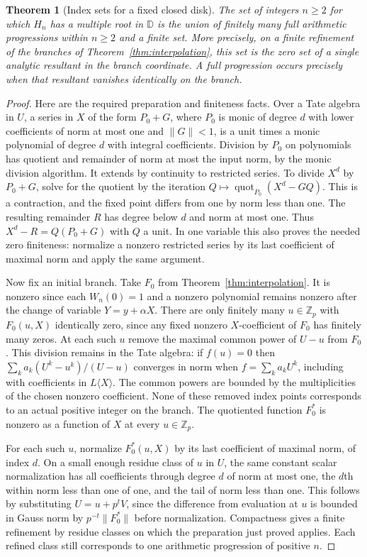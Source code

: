\documentclass[11pt]{article}
\newtheorem{theorem}{Theorem}\newtheorem{lemma}[theorem]{Lemma}
\begin{document}
\begin{theorem}[Index sets for a fixed closed disk]\label{thm:local-set}
The set of integers $n\ge2$ for which $H_n$ has a multiple root
in $\mathbb D$ is the union of finitely many full arithmetic
progressions within $n\ge2$ and a finite set.
More precisely, on a finite refinement of the branches of
Theorem~\ref{thm:interpolation}, this set is the zero set of
a single analytic resultant in the branch coordinate. A full
progression occurs precisely when that resultant vanishes
identically on the branch.
\end{theorem}
\begin{proof}
Here are the required preparation and finiteness facts.
Over a Tate algebra in $U$, a series in $X$ of the form
$P_0+G$, where $P_0$ is monic of degree $d$ with lower coefficients
of norm at most one and $\|G\|<1$, is a unit times a monic
polynomial of degree $d$ with integral coefficients.
Division by $P_0$ on polynomials has quotient and remainder
of norm at most the input norm, by the monic division algorithm.
It extends by continuity to restricted series. To divide
$X^d$ by $P_0+G$, solve for the quotient by the iteration
$Q\mapsto\operatorname{quot}_{P_0}(X^d-GQ)$.
This is a contraction, and the fixed point differs from one
by norm less than one. The resulting remainder $R$ has
degree below $d$ and norm at most one. Thus $X^d-R=Q(P_0+G)$
with $Q$ a unit. In one variable this also proves the needed
zero finiteness: normalize a nonzero restricted series by its
last coefficient of maximal norm and apply the same argument.

Now fix an initial branch. Take $F_0$ from
Theorem~\ref{thm:interpolation}. It is nonzero since each
$W_n(0)=1$ and a nonzero polynomial remains nonzero after
the change of variable $Y=y+\alpha X$.
There are only finitely many $u\in\mathbb Z_p$ with
$F_0(u,X)$ identically zero, since any fixed nonzero
$X$-coefficient of $F_0$ has finitely many zeros.
At each such $u$ remove the maximal common power of $U-u$
from $F_0$. This division remains in the Tate algebra:
if $f(u)=0$ then $\sum_k a_k(U^k-u^k)/(U-u)$ converges
in norm when $f=\sum_k a_kU^k$, including with coefficients
in $L\langle X\rangle$. The common powers are bounded by the
multiplicities of the chosen nonzero coefficient. None of these
removed index points corresponds to an actual positive integer
on the branch. The quotiented function $F_0^*$ is nonzero as a
function of $X$ at every $u\in\mathbb Z_p$.

For each such $u$, normalize $F_0^*(u,X)$ by its last coefficient
of maximal norm, of index $d$. On a small enough residue
class of $u$ in $U$, the same constant scalar normalization
has all coefficients through degree $d$ of norm at most one,
the $d$th within norm less than one of one, and the tail
of norm less than one. This follows by substituting
$U=u+p^tV$, since the difference from evaluation at $u$
is bounded in Gauss norm by $p^{-t}\|F_0^*\|$ before
normalization. Compactness gives a finite refinement by
residue classes on which the preparation just proved applies.
Each refined class still corresponds to one arithmetic progression
of positive $n$.


\end{proof}
\end{document}
